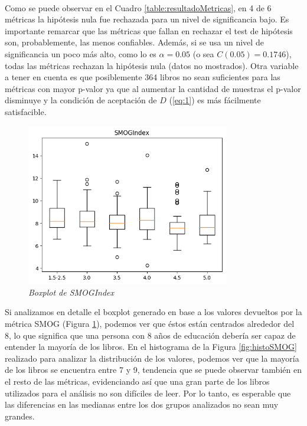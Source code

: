 \documentclass[12pt,journal,compsoc]{IEEEtran}
\begin{document}
~

Como se puede observar en el Cuadro \ref{table:resultadoMetricas}, en 4 de 6 métricas la hipótesis nula fue rechazada para un nivel de significancia bajo. Es importante remarcar que las métricas que fallan en rechazar el test de hipótesis son, probablemente, las menos confiables. Además, si se usa un nivel de significancia un poco más alto, como lo es $\alpha = 0.05$ (o sea $C(0.05) = 0.1746$), todas las métricas rechazan la hipótesis nula (datos no mostrados). Otra variable a tener en cuenta es que posiblemente 364 libros no sean suficientes para las métricas con mayor p-valor ya que al aumentar la cantidad de muestras el p-valor disminuye y la condición de aceptación de $D$ (\ref{eq:1}) es más fácilmente satisfacible.

\begin{figure}[H]
\begin{center}
  \includegraphics[width=3.5in]{../unigrams/scripts/boxplots/not-normalized-SMOGIndex.png}
  \caption{\small \textit{Boxplot de SMOGIndex}}
  \label{fig:boxplotSMOG}
  \end{center}
\end{figure}

Si analizamos en detalle el boxplot generado en base a los valores devueltos por la métrica SMOG (Figura \ref{fig:boxplotSMOG}), podemos ver que éstos están centrados alrededor del 8, lo que significa que una persona con 8 años de educación debería ser capaz de entender la mayoría de los libros. En el histograma de la Figura \ref{fig:histoSMOG} realizado para analizar la distribución de los valores, podemos ver que la mayoría de los libros se encuentra entre 7 y 9, tendencia que se puede observar también en el resto de las métricas, evidenciando así que una gran parte de los libros utilizados para el análisis no son difíciles de leer. Por lo tanto, es esperable que las diferencias en las medianas entre los dos grupos analizados no sean muy grandes.
\end{document}
